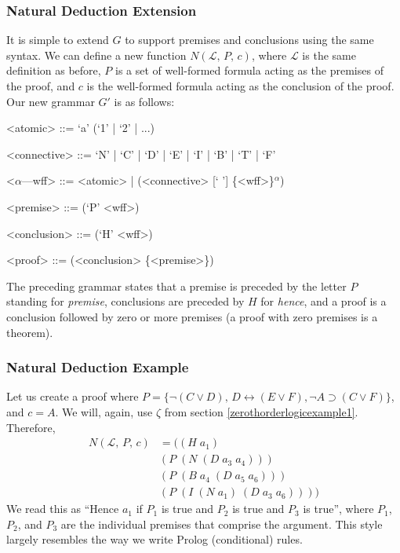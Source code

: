 \documentclass[ms]{uncgdissertationexp2}
\theoremstyle{plain}
\theoremstyle{definition}
\theoremstyle{remark}
\begin{document}
\subsubsection{Natural Deduction Extension} It is simple to extend $G$ to support premises and conclusions using the same syntax. We can define a new function $N(\mathcal{L},\,P,\,c)$, where $\mathcal{L}$ is the same definition as before, $P$ is a set of well-formed formula acting as the premises of the proof, and $c$ is the well-formed formula acting as the conclusion of the proof. Our new grammar $G'$ is as follows:
\begin{grammar}
	<atomic> ::= `a' (`1' | `2' | ...)
	
	<connective> ::= `N' | `C' | `D' | `E' | `I' | `B' | `T' | `F' 
	
	<$\alpha$---wff> ::= <atomic> | (<connective> [` '] \{<wff>\}$^{\alpha}$)
	
	<premise> ::= (`P' <wff>)
	
	<conclusion> ::= (`H' <wff>)
	
	<proof> ::= (<conclusion> \{<premise>\})
\end{grammar}
The preceding grammar states that a premise is preceded by the letter $P$ standing for \textit{premise}, conclusions are preceded by $H$ for \textit{hence}, and a proof is a conclusion followed by zero or more premises (a proof with zero premises is a theorem).

\subsubsection{Natural Deduction Example}
Let us create a proof where $P = \{\lnot(C \lor D),\,D \leftrightarrow (E \lor F), \lnot A \supset (C \lor F)\}$, and $c = A$. We will, again, use $\zeta$ from section \ref{zerothorderlogicexample1}. Therefore, 
\begin{align*}
	N(\mathcal{L},\,P,\,c) & = ((H\;a_1)\;                    \\
	                     & (P\;(N\;(D\;a_3\;a_4)))            \\
	                     & (P\;(B\;a_4\;(D\;a_5\;a_6)))       \\
	                     & (P\;(I\;(N\;a_1)\;(D\;a_3\;a_6))))
\end{align*}
We read this as ``Hence $a_1$ if $P_1$ is true and $P_2$ is true and $P_3$ is true'', where $P_1$, $P_2$, and $P_3$ are the individual premises that comprise the argument. This style largely resembles the way we write Prolog (conditional) rules. 
\end{document}
